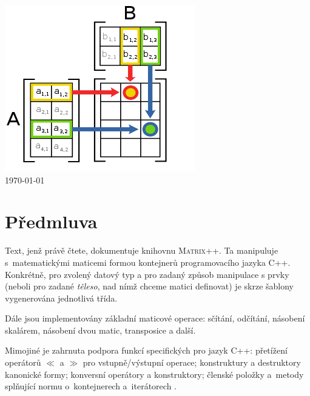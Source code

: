 \documentclass[11pt,a4paper]{article}
\newcommand{\cpp}{\textsc{C++}}
\newcommand{\mpp}{\textsc{Matrix++}}
\begin{document}
\begin{titlepage}
\begin{center}
\vfill
\includegraphics[viewport=140 15 150 65,scale=0.75]{./front.png}\\[1cm]    

{\large \today}

\end{center}

\end{titlepage}

\thispagestyle{empty}

\begin{abstract}
Dokumentace k zápočtovému programu.
Práce je implementací ša\-blo\-no\-va\-né knihovny pro práci s maticemi
representované ve formě kontejnerů jazyka~\cpp.
\end{abstract}

\pagebreak

\thispagestyle{empty}
\tableofcontents

\pagebreak

\setcounter{page}{1}
\pagestyle{headings}

\part{Předmluva}

Text, jenž právě čtete, dokumentuje knihovnu \mpp.
Ta manipuluje s~matematickými maticemi formou kontejnerů programovacího jazyka
C++.
Konkrétně, pro zvolený datový typ a pro zadaný způsob manipulace s prvky
(neboli pro zadané \emph{těleso\/}, nad nímž chceme matici definovat) je skrze
šablony vygenerována jednotlivá třída.

Dále jsou implementovány základní maticové operace: sčítání, odčítání, násobení
skalárem, násobení dvou matic, transposice a další.

Mimojiné je zahrnuta podpora funkcí specifických pro jazyk \cpp: přetí\-že\-ní
operátorů $\ll$ a $\gg$ pro vstupně/výstupní operace; konstruktury a
destruktory kanonické formy; konversní operátory a konstruktory; členské
po\-lož\-ky a~metody splňující normu o~kontejnerech a~iterátorech
\cite{iso-norma}.
\end{document}
